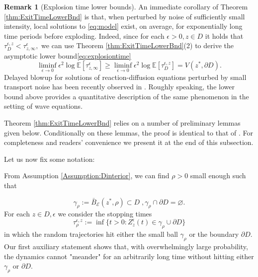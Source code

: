 \documentclass[10pt, reqno]{amsart}
\newcommand{\ex}{\mathbb{E}}
\newcommand{\e}{\mathcal{E}}
\theoremstyle{definition}
\newtheorem{rem}{Remark}
\numberwithin{lem}{section}
\numberwithin{cor}{section}
\numberwithin{prop}{section}
\numberwithin{thm}{section}
\numberwithin{dfn}{section}
\begin{document}
\begin{rem}[Explosion time lower bounds]\label{rem:explosiontimes}
An immediate corollary of Theorem \ref{thm:ExitTimeLowerBnd} is that, when perturbed by noise of sufficiently small intensity, local solutions to \eqref{eq:model} exist, on average, for exponentially long time periods before exploding. Indeed, since for each $\epsilon>0, z\in D$ it holds that $\tau_D^{\epsilon, z}<\tau^\epsilon_{z,\infty},$ we can use  Theorem \ref{thm:ExitTimeLowerBnd}(2) to derive the asymptotic lower bound\eqref{eq:explosiontime}
    \begin{equation*}
        \liminf_{\epsilon\to 0}\epsilon^2\log\ex[\tau^\epsilon_{z,\infty}]\geq \liminf_{\epsilon\to 0}\epsilon^2\log\ex[\tau^{\epsilon,z}_{D}]= V(z^*,\partial D).
    \end{equation*}
    Delayed blowup for solutions of reaction-diffusion equations perturbed by small transport noise has been recently observed in \cite{agresti2024delayed}. Roughly speaking, the lower bound above provides a quantitative description of the same phenomenon in the setting of wave equations.
\end{rem}








Theorem \ref{thm:ExitTimeLowerBnd} relies on a number of preliminary lemmas given below. Conditionally on these lemmas, the proof is identical to that of \cite[Theorem 5.7.11(a)]{dembo2009large}. For completeness and readers' convenience we present it at the end of this subsection. 


Let us now fix some notation: 

From Assumption \ref{Assumption:Dinterior}, we can find $\rho>0$ small enough such that 

\begin{equation}\label{eq:gammarhodef}
    \gamma_\rho:= \bar{B}_\e(z^*, \rho)\subset D\;,\gamma_\rho\cap\partial D=\varnothing.
\end{equation} 
For each $z\in D , \epsilon$ we consider the stopping times 
\begin{equation}\label{eq:taurhodef}
    \tau^{\epsilon, z}_{\rho}:=\inf\bigg\{ t>0: Z_z^\epsilon(t)\in\gamma_\rho\cup\partial D     \bigg\}
\end{equation}
in which the random trajectories hit either the small ball $\gamma_\rho$ or the boundary $\partial D.$ Our first auxiliary statement shows that, with overwhelmingly large probability, the dynamics cannot "meander" for an arbitrarily long time without hitting either $\gamma_\rho$ or $\partial D.$
\end{document}
